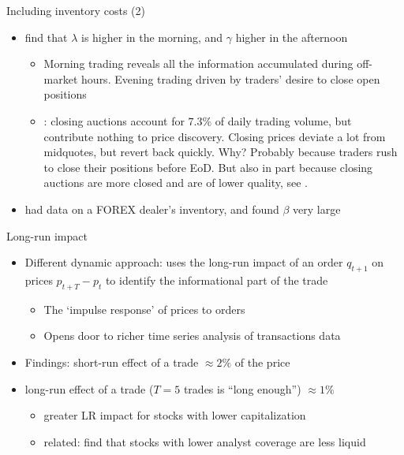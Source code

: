 \documentclass[english,10pt
,aspectratio=169
]{beamer}
\begin{document}
\begin{frame}{Including inventory costs (2)}
		\begin{itemize}
			\item \textbf{\citet*{madhavan_why_1997}} find that $\lambda$ is higher in the morning, and $\gamma$ higher in the afternoon
			\begin{itemize}
				\item Morning trading reveals all the information accumulated during off-market hours. Evening trading driven by traders' desire to close open positions
				\item \textbf{\cite{bogousslavsky_should_2020}}: closing auctions account for $7.3\%$ of daily trading volume, but contribute nothing to price discovery. Closing prices deviate a lot from midquotes, but revert back quickly. Why? 
				\pause 
				Probably because traders rush to close their positions before EoD. But also in part because closing auctions are more closed and are of lower quality, see \textbf{\cite{hu_vestigial_2020}}.
			\end{itemize}
			\item \textbf{\cite{lyons_tests_1995}} had data on a FOREX dealer's inventory, and found $\beta$ very large
		\end{itemize}
\end{frame}


\begin{frame}{Long-run impact}
	\begin{itemize}
		\item Different dynamic approach: \textbf{\cite{hasbrouck_measuring_1991}} uses the long-run impact of an order $q_{t+1}$ on prices $p_{t+T}-p_t$ to identify the informational part of the trade
		\begin{itemize}
			\item The `impulse response' of prices to orders
			\item Opens door to richer time series analysis of transactions data
		\end{itemize}
		\item Findings: short-run effect of a trade $\approx 2\%$ of the price
		\item long-run effect of a trade ($T=5$ trades is ``long enough'') $\approx 1\%$
		\begin{itemize}
			\item greater LR impact for stocks with lower capitalization
			\item related: \textbf{\cite{ellul_financial_2018}} find that stocks with lower analyst coverage are less liquid
		\end{itemize}
	\end{itemize}
\end{frame}
\end{document}
